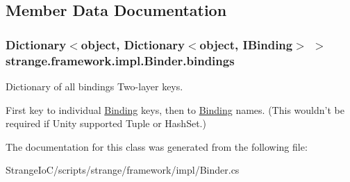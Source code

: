 \subsection{Member Data Documentation}
\hypertarget{classstrange_1_1framework_1_1impl_1_1_binder_a3b76e3cb4822c1f8732fd45fbd4d1802}{
\subsubsection[{bindings}]{\setlength{\rightskip}{0pt plus 5cm}Dictionary$<$object, Dictionary$<$object, {\bf I\-Binding}$>$ $>$ strange.\-framework.\-impl.\-Binder.\-bindings\hspace{0.3cm}{\ttfamily [protected]}}}\label{classstrange_1_1framework_1_1impl_1_1_binder_a3b76e3cb4822c1f8732fd45fbd4d1802}


Dictionary of all bindings Two-\/layer keys. 

First key to individual \hyperlink{classstrange_1_1framework_1_1impl_1_1_binding}{Binding} keys, then to \hyperlink{classstrange_1_1framework_1_1impl_1_1_binding}{Binding} names. (This wouldn't be required if Unity supported Tuple or Hash\-Set.) 

The documentation for this class was generated from the following file\-:\begin{DoxyCompactItemize}
\item 
Strange\-Io\-C/scripts/strange/framework/impl/Binder.\-cs\end{DoxyCompactItemize}
